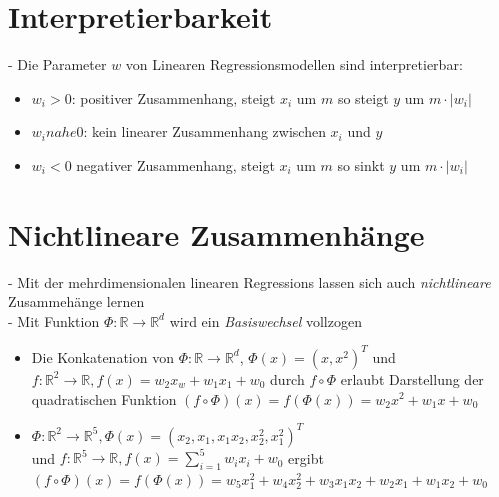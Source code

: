 \documentclass{report}
\begin{document}
  \section{Interpretierbarkeit}	
  - Die Parameter $w$ von Linearen Regressionsmodellen sind interpretierbar:\\	
  \vspace*{-1.25em}	
  \begin{itemize}	
    \item $w_i > 0$: positiver Zusammenhang, steigt $x_i$ um $m$ so steigt $y$ um $m\cdot |w_i|$	
    \item $w_i nahe 0$: kein linearer Zusammenhang zwischen $x_i$ und $y$	
    \item $w_i < 0$ negativer Zusammenhang, steigt $x_i$ um $m$ so sinkt $y$ um $m\cdot |w_i|$	
  \end{itemize}	
  
  \section{Nichtlineare Zusammenhänge}	
  - Mit der mehrdimensionalen linearen Regressions lassen sich auch \textit{nichtlineare} Zusammehänge lernen\\	
  - Mit Funktion $\Phi: \mathbb{R} \rightarrow \mathbb{R}^d$ wird ein \textit{Basiswechsel} vollzogen\\	
  \vspace*{-1.25em}	
  \begin{itemize}	
    \item Die Konkatenation von $\Phi: \mathbb{R} \rightarrow \mathbb{R}^d$, $\Phi(x) = (x, x^2)^T$	
    und $f: \mathbb{R}^2 \rightarrow \mathbb{R}, f(x) = w_2x_w + w_1x_1 + w_0$ durch $f\circ \Phi$	
    erlaubt Darstellung der quadratischen Funktion $(f\circ \Phi)(x) = f(\Phi(x)) = w_2x^2 + w_1x + w_0$	
    \item $\Phi: \mathbb{R}^2 \rightarrow \mathbb{R}^5, \Phi(x) = (x_2, x_1, x_1x_2, x_2^2, x_1^2)^T$\\	
    und $f: \mathbb{R}^5 \rightarrow \mathbb{R}, f(x) = \sum_{i = 1}^5 w_ix_i + w_0$ ergibt $(f\circ \Phi)(x) = f(\Phi(x)) = w_5x_1^2 + w_4x_2^2 + w_3x_1x_2 + w_2x_1 + w_1x_2 + w_0$	
  \end{itemize}	
  
\end{document}
